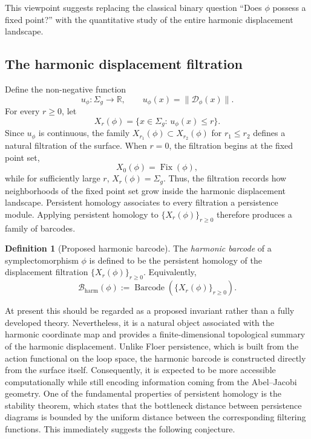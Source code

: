 \documentclass[11pt]{article}
\theoremstyle{definition}
\newtheorem{definition}[theorem]{Definition}
\begin{document}
	This viewpoint suggests replacing the classical binary question ``Does $\phi$
	possess a fixed point?'' with the quantitative study of the entire harmonic
	displacement landscape.
	
	\subsection*{The harmonic displacement filtration}
	
	Define the non-negative function
	\[
	u_\phi:\Sigma_g\longrightarrow\mathbb R,
	\qquad
	u_\phi(x)=\|\mathcal D_\phi(x)\|.
	\]
	For every $r\ge0$, let
	\[
	X_r(\phi) = \{x\in\Sigma_g:\, u_\phi(x)\le r\}.
	\]
	Since $u_\phi$ is continuous, the family $X_{r_1}(\phi) \subset X_{r_2}(\phi)$
	for $r_1\le r_2$ defines a natural filtration of the surface. When $r=0$, the
	filtration begins at the fixed point set,
	\[
	X_0(\phi) = \operatorname{Fix}(\phi),
	\]
	while for sufficiently large $r$, $X_r(\phi)=\Sigma_g.$	Thus, the filtration records how neighborhoods of the fixed point set grow inside
	the harmonic displacement landscape. Persistent homology associates to every
	filtration a persistence module. Applying persistent homology to $\{X_r(\phi)\}_{r\ge0}$
	therefore produces a family of barcodes.
	
	\begin{definition}[Proposed harmonic barcode]
		The \emph{harmonic barcode} of a symplectomorphism $\phi$ is defined to be the
		persistent homology of the displacement filtration $\{X_r(\phi)\}_{r\ge0}.$
		Equivalently,
		\[
		\mathcal B_{\mathrm{harm}}(\phi) := \operatorname{Barcode} \left(
		\{X_r(\phi)\}_{r\ge0} \right).
		\]
	\end{definition}
	
	At present this should be regarded as a proposed invariant rather than a fully
	developed theory. Nevertheless, it is a natural object associated with the
	harmonic coordinate map and provides a finite-dimensional topological summary of
	the harmonic displacement. Unlike Floer persistence, which is built from the
	action functional on the loop space, the harmonic barcode is constructed
	directly from the surface itself. Consequently, it is expected to be more
	accessible computationally while still encoding information coming from the
	Abel--Jacobi geometry.	One of the fundamental properties of persistent homology is the stability
	theorem, which states that the bottleneck distance between persistence diagrams
	is bounded by the uniform distance between the corresponding filtering
	functions. This immediately suggests the following conjecture.
	
\end{document}
